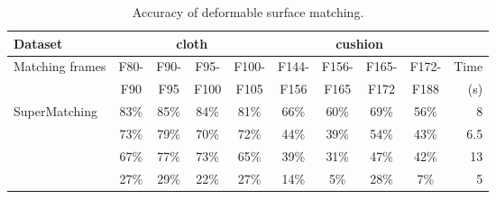 \begin{table}[tb]
\centering
\tabcolsep=1pt
\setlength{\aboverulesep}{0pt}
\setlength{\belowrulesep}{0pt}
\caption{Accuracy of deformable surface matching.}
\hspace{-5ex}
\label{tab:errorrate1}
\small
\begin{tabular}{l|c c c c | c c c c | r}
\toprule
{Dataset}  & \multicolumn{4}{|c|}{ {cloth}} & \multicolumn{4}{c|}{ {cushion}} & \\
\hline
 {Matching frames} &  {F80-}	&  {F90-}	& {F95-}	& {F100-} & {F144-} & {F156-}	& {F165-}	& {F172-} &  {Time}  \\
 {}                &  {F90 }    &  {F95 }   & {F100}    & {F105}  & {F156}  & {F165}    & {F172}    & {F188}  &  {(s)} \\
\hline
 {SuperMatching}   &  {83\%}    &  {85\%}	& {84\%} 	& {81\%}  & {66\%}	& {60\%}	& {69\%}	& {56\%}  &  {8}  \\
 {\cite{Zass08}}   & {73\%}	    & {79\%}	& {70\%}	& {72\%}  & {44\%}  & {39\%}    & {54\%}	& {43\%}   & {6.5}  \\
{\cite{Duchenne09}} & {67\%}    & {77\%}    & {73\%}	& {65\%}  & {39\%}	& {31\%}	& {47\%}	& {42\%}   & {13}  \\
 {\cite{Cour06}}   & {27\%}     & {29\%}	&  {22\%}	& {27\%}  & {14\%}  & {5\%}	    & {28\%}	& {7\%}    & {5}  \\
\bottomrule
\end{tabular}%
\end{table}%

